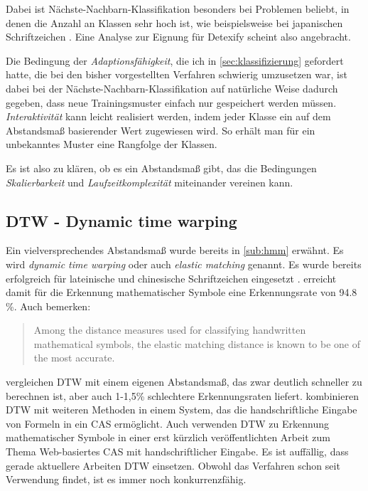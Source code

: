 Dabei ist Nächste-Nachbarn-Klassifikation besonders bei Problemen beliebt, in denen die Anzahl an Klassen sehr hoch ist, wie beispielsweise bei japanischen Schriftzeichen \cite{Jaeger:2003p1097}. Eine Analyse zur Eignung für Detexify scheint also angebracht.

Die Bedingung der \emph{Adaptionsfähigkeit}, die ich in \ref{sec:klassifizierung} gefordert hatte, die bei den bisher vorgestellten Verfahren schwierig umzusetzen war, ist dabei bei der Nächste-Nachbarn-Klassifikation auf natürliche Weise dadurch gegeben, dass neue Trainingsmuster einfach nur gespeichert werden müssen. \emph{Interaktivität} kann leicht realisiert werden, indem jeder Klasse ein auf dem Abstandsmaß basierender Wert zugewiesen wird. So erhält man für ein unbekanntes Muster eine Rangfolge der Klassen.

Es ist also zu klären, ob es ein Abstandsmaß gibt, das die Bedingungen \emph{Skalierbarkeit} und \emph{Laufzeitkomplexität} miteinander vereinen kann.

\subsection[DTW]{DTW - Dynamic time warping} \label{sub:dtws}

Ein vielversprechendes Abstandsmaß wurde bereits in \ref{sub:hmm} erwähnt. Es wird \emph{dynamic time warping} oder auch \emph{elastic matching} genannt. Es wurde bereits erfolgreich für lateinische und chinesische Schriftzeichen eingesetzt \cite{Tappert:1990p10302}. \citet{Xie:2007p11427} erreicht damit für die Erkennung mathematischer Symbole eine Erkennungsrate von 94.8 \%. Auch \citet{Golubitsky:2009p2433} bemerken:
\begin{quote}
  Among the distance measures used for classifying handwritten mathematical symbols, the elastic matching distance is known to be one of the most accurate.
\end{quote}

\citet{Golubitsky:2009p1842} vergleichen DTW mit einem eigenen Abstandsmaß, das zwar deutlich schneller zu berechnen ist, aber auch 1-1,5\% schlechtere Erkennungsraten liefert. \citet{Labahn:2008p10301} kombinieren DTW mit weiteren Methoden in einem System, das die handschriftliche Eingabe von Formeln in ein \ac{CAS} ermöglicht.
Auch \citet{Vuong:2010p10279} verwenden DTW %
zu Erkennung mathematischer Symbole in einer erst kürzlich veröffentlichten Arbeit zum Thema Web-basiertes CAS mit handschriftlicher Eingabe. Es ist auffällig, dass gerade aktuellere Arbeiten DTW einsetzen. Obwohl das Verfahren schon seit \citeyear{Tappert:1982p10305} \cite{Tappert:1982p10305} Verwendung findet, ist es immer noch konkurrenzfähig.

